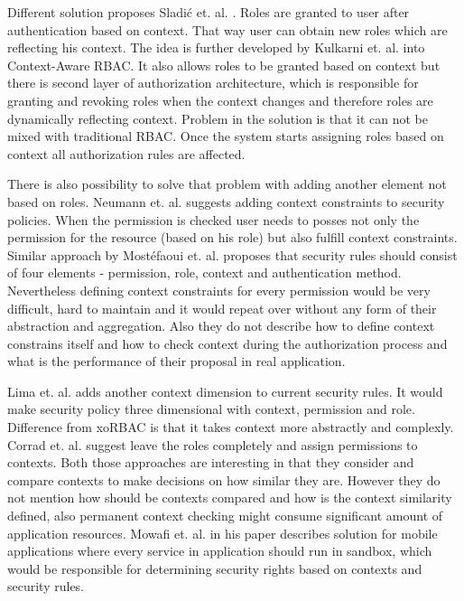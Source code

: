 \documentclass{sig-alternate}
\begin{document}
Different solution proposes Sladi\'c et. al. \cite{contextaccess}. Roles are granted to user after authentication based on context. That way user can obtain new roles which are reflecting his context. The idea is further developed by Kulkarni et. al. \cite{contextawarerbac} into Context-Aware RBAC. It also allows roles to be granted based on context but there is second layer of authorization architecture, which is responsible for granting and revoking roles when the context changes and therefore roles are dynamically reflecting context. Problem in the solution is that it can not be mixed with traditional RBAC. Once the system starts assigning roles based on context all authorization rules are affected. 

There is also possibility to solve that problem with adding another element not based on roles. Neumann et. al. \cite{xorbac} suggests adding context constraints to security policies. When the permission is checked user needs to posses not only the permission for the resource (based on his role) but also fulfill context constraints. Similar approach by Most\'efaoui et. al. \cite{genericcontext} proposes that security rules should consist of four elements - permission, role, context and authentication method. Nevertheless defining context constraints for every permission would be very difficult, hard to maintain and it would repeat over without any form of their abstraction and aggregation. Also they do not describe how to define context constrains itself and how to check context during the authorization process and what is the performance of their proposal in real application.

Lima et. al. \cite{contextlayer} adds another context dimension to current security rules. It would make security policy three dimensional with context, permission and role. Difference from xoRBAC \cite{xorbac} is that it takes context more abstractly and complexly. Corrad et. al. \cite{ubiscom} suggest leave the roles completely and assign permissions to contexts. Both those approaches are interesting in that they consider and compare contexts to make decisions on how similar they are. However they do not mention how should be contexts compared and how is the context similarity defined, also permanent context checking might consume significant amount of application resources. Mowafi et. al. \cite{contextAwareMobile} in his paper describes solution for mobile applications where every service in application should run in sandbox, which would be responsible for determining security rights based on contexts and security rules.
\end{document}
